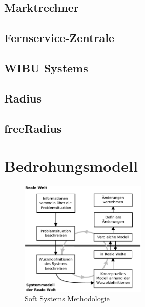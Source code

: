 \documentclass[11pt,a4paper]{report}
\begin{document}
\section{Marktrechner}
\section{Fernservice-Zentrale}
\section{WIBU Systems}
\section{Radius}
\section{freeRadius}


\chapter{Bedrohungsmodell} \label{chap:threat}

\begin{figure}
\centering
\includegraphics[width=6cm]{images/ssm.pdf}
\caption{Soft Systems Methodologie}
\label{fig:ssm}
\end{figure}
\end{document}
